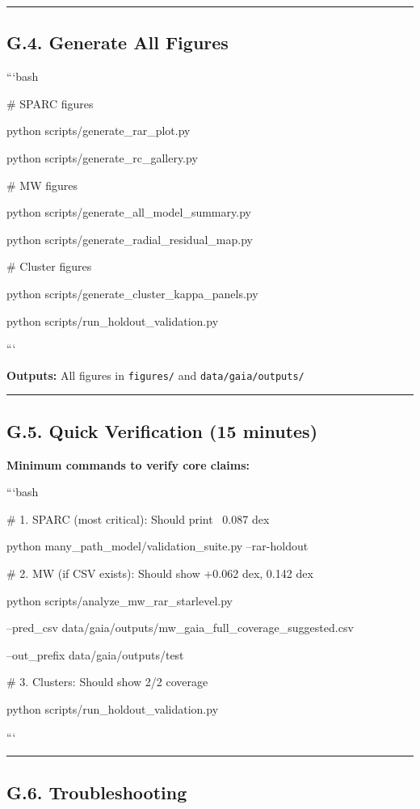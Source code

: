 \documentclass[11pt,a4paper]{article}
\begin{document}
\medskip\hrule\medskip


\subsection{G.4. Generate All Figures}


```bash

\# SPARC figures

python scripts/generate\_rar\_plot.py

python scripts/generate\_rc\_gallery.py


\# MW figures

python scripts/generate\_all\_model\_summary.py

python scripts/generate\_radial\_residual\_map.py


\# Cluster figures

python scripts/generate\_cluster\_kappa\_panels.py

python scripts/run\_holdout\_validation.py

```


\textbf{Outputs:} All figures in \texttt{figures/} and \texttt{data/gaia/outputs/}


\medskip\hrule\medskip


\subsection{G.5. Quick Verification (15 minutes)}


\textbf{Minimum commands to verify core claims:}


```bash

\# 1. SPARC (most critical): Should print ~0.087 dex

python many\_path\_model/validation\_suite.py --rar-holdout


\# 2. MW (if CSV exists): Should show +0.062 dex, 0.142 dex  

python scripts/analyze\_mw\_rar\_starlevel.py \

  --pred\_csv data/gaia/outputs/mw\_gaia\_full\_coverage\_suggested.csv \

  --out\_prefix data/gaia/outputs/test


\# 3. Clusters: Should show 2/2 coverage

python scripts/run\_holdout\_validation.py

```


\medskip\hrule\medskip


\subsection{G.6. Troubleshooting}
\end{document}
